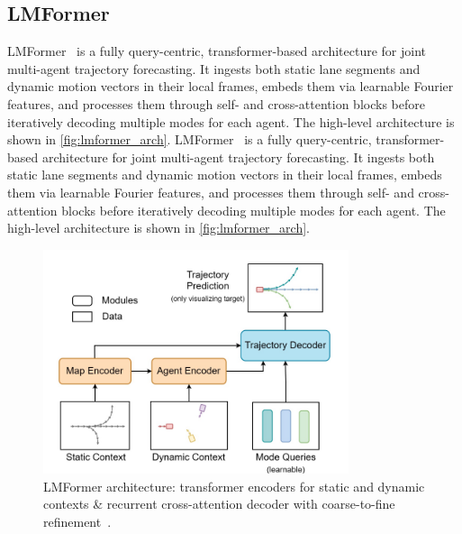 \subsection{LMFormer}
\label{ssec:lmformer}

LMFormer~\cite{lmformerYadav2025} is a fully query-centric, transformer-based architecture for joint multi-agent trajectory forecasting. It ingests both static lane segments and dynamic motion vectors in their local frames, embeds them via learnable Fourier features, and processes them through self- and cross-attention blocks before iteratively decoding multiple modes for each agent. The high-level architecture is shown in \autoref{fig:lmformer_arch}.
LMFormer~\cite{lmformerYadav2025} is a fully query-centric, transformer-based architecture for joint multi-agent trajectory forecasting. It ingests both static lane segments and dynamic motion vectors in their local frames, embeds them via learnable Fourier features, and processes them through self- and cross-attention blocks before iteratively decoding multiple modes for each agent. The high-level architecture is shown in \autoref{fig:lmformer_arch}.

\begin{figure}[ht]
  \centering
  \includegraphics[width=0.8\textwidth]{figures/lmformer_arch.png}
  \caption{LMFormer architecture: transformer encoders for static and dynamic contexts \& recurrent cross-attention decoder with coarse-to-fine refinement~\cite{lmformerYadav2025}.}
  \label{fig:lmformer_arch}
\end{figure}


